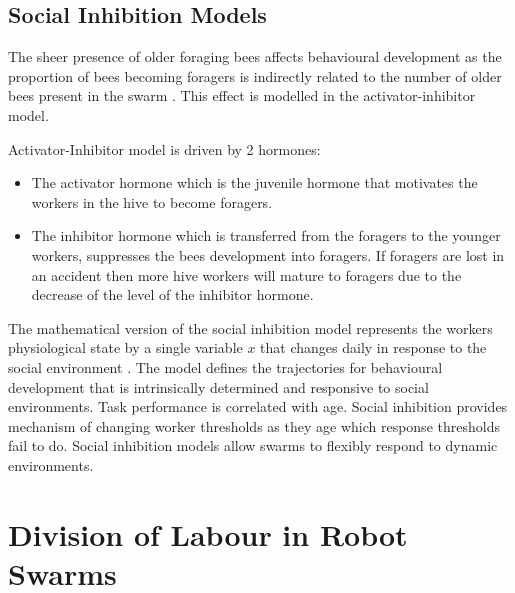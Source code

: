 \subsection{Social Inhibition Models}

The sheer presence of older foraging bees affects behavioural development as the proportion of bees becoming foragers is indirectly related to the number of older bees present in the swarm . This effect is modelled in the activator-inhibitor model.

Activator-Inhibitor model is driven by 2 hormones:
\begin{itemize}
	\item The activator hormone which is the juvenile hormone that motivates the workers in the hive to become foragers.
	\item The inhibitor hormone which is transferred from the foragers to the younger workers, suppresses the bees development into foragers. If foragers are lost in an accident then more hive workers will mature to foragers due to the decrease of the level of the inhibitor hormone.
\end{itemize}

The mathematical version of the social inhibition model represents the workers physiological state by a single variable $x$ that changes daily in response to the social environment \cite{beshers2001social}. The model defines the trajectories for behavioural development that is intrinsically determined and responsive to social environments. Task performance is correlated with age. Social inhibition provides mechanism of changing worker thresholds as they age which response thresholds fail to do. Social inhibition models allow swarms to flexibly respond to dynamic environments. %

\section{Division of Labour in Robot Swarms}

